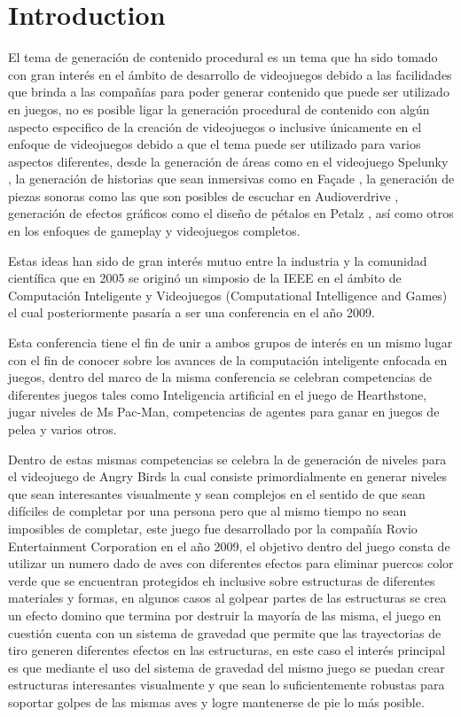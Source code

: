 \chapter{Introduction}
\label{chapter:introduction}

El tema de generación de contenido procedural es un tema que ha sido tomado con
gran interés en el ámbito de desarrollo de videojuegos debido a las facilidades
que brinda a las compañías para poder generar contenido que puede ser utilizado
en juegos, no es posible ligar la generación procedural de contenido con algún
aspecto especifico de la creación de videojuegos o inclusive únicamente en el
enfoque de videojuegos debido a que el tema puede ser utilizado para varios
aspectos diferentes, desde la generación de áreas como en el videojuego Spelunky
\cite{RovioEntertainmentCorporation2009} \cite{Mossmouth2013}
\cite{Mossmouth2013}, la generación de historias que sean inmersivas como en
Façade \cite{Mateas}, la generación de piezas sonoras como las que son posibles
de escuchar en Audioverdrive \cite{Holtar}, generación de efectos gráficos como
el diseño de pétalos en Petalz \cite{Risi2012}, así como otros en los enfoques
de gameplay y videojuegos completos.

Estas ideas han sido de gran interés mutuo entre la industria y la comunidad
científica que en 2005 se originó un simposio de la IEEE en el ámbito de
Computación Inteligente y Videojuegos (Computational Intelligence and Games) el
cual posteriormente pasaría a ser una conferencia en el año 2009.

Esta conferencia tiene el fin de unir a ambos grupos de interés en un mismo
lugar con el fin de conocer sobre los avances de la computación inteligente
enfocada en juegos, dentro del marco de la misma conferencia se celebran
competencias de diferentes juegos tales como Inteligencia artificial en el juego
de Hearthstone, jugar niveles de Ms Pac-Man, competencias de agentes para ganar
en juegos de pelea y varios otros.

Dentro de estas mismas competencias se celebra la de generación de niveles para
el videojuego de Angry Birds la cual consiste primordialmente en generar niveles
que sean interesantes visualmente y sean complejos en el sentido de que sean
difíciles de completar por una persona pero que al mismo tiempo no sean
imposibles de completar, este juego fue desarrollado por la compañía Rovio
Entertainment Corporation\cite{RovioEntertainmentCorporation2009} en el año
2009, el objetivo dentro del juego consta de utilizar un numero dado de aves con
diferentes efectos para eliminar puercos color verde que se encuentran
protegidos eh inclusive sobre estructuras de diferentes materiales y formas, en
algunos casos al golpear partes de las estructuras se crea un efecto domino que
termina por destruir la mayoría de las misma, el juego en cuestión cuenta con un
sistema de gravedad que permite que las trayectorias de tiro generen diferentes
efectos en las estructuras, en este caso el interés principal es que mediante el
uso del sistema de gravedad del mismo juego se puedan crear estructuras
interesantes visualmente y que sean lo suficientemente robustas para soportar
golpes de las mismas aves y logre mantenerse de pie lo más posible.


